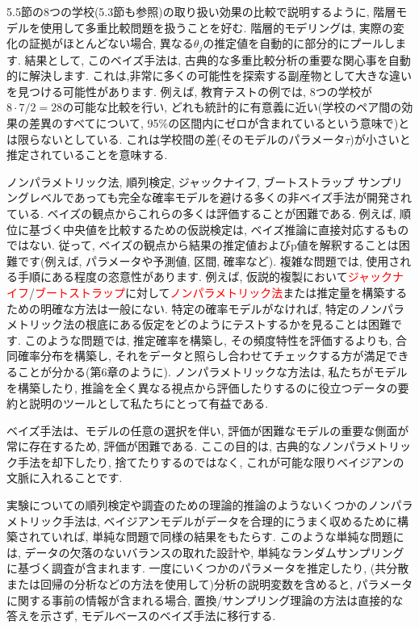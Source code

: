 \documentclass[10pt,dvipdfmx,a4]{beamer}
\newcommand{\tcr}[1]{\textcolor{red}{#1}}
\begin{document}

\begin{frame}
5.5節の8つの学校(5.3節も参照)の取り扱い効果の比較で説明するように, 階層モデルを使用して多重比較問題を扱うことを好む.
階層的モデリングは, 実際の変化の証拠がほとんどない場合, 異なる$\theta_j$の推定値を自動的に部分的にプールします.
結果として, このベイズ手法は, 古典的な多重比較分析の重要な関心事を自動的に解決します.
これは,非常に多くの可能性を探索する副産物として大きな違いを見つける可能性があります.
例えば, 教育テストの例では, 8つの学校が$8\cdot 7/2=28$の可能な比較を行い, どれも統計的に有意義に近い(学校のペア間の効果の差異のすべてについて, 95\%の区間内にゼロが含まれているという意味で)とは限らないとしている.
これは学校間の差(そのモデルのパラメータ$\tau$)が小さいと推定されていることを意味する.

\end{frame}


\begin{frame}{ノンパラメトリック法, 順列検定, ジャックナイフ, ブートストラップ}
サンプリングレベルであっても完全な確率モデルを避ける多くの非ベイズ手法が開発されている.
ベイズの観点からこれらの多くは評価することが困難である.
例えば, 順位に基づく中央値を比較するための仮説検定は, ベイズ推論に直接対応するものではない.
従って, ベイズの観点から結果の推定値およびp値を解釈することは困難です(例えば, パラメータや予測値, 区間, 確率など).
複雑な問題では, 使用される手順にある程度の恣意性があります.
例えば, 仮説的複製において\tcr{ジャックナイフ}/\tcr{ブートストラップ}に対して\tcr{ノンパラメトリック法}または推定量を構築するための明確な方法は一般にない.
特定の確率モデルがなければ, 特定のノンパラメトリック法の根底にある仮定をどのようにテストするかを見ることは困難です.
このような問題では, 推定確率を構築し, その頻度特性を評価するよりも, 合同確率分布を構築し, それをデータと照らし合わせてチェックする方が満足できることが分かる(第6章のように).
ノンパラメトリックな方法は, 私たちがモデルを構築したり, 推論を全く異なる視点から評価したりするのに役立つデータの要約と説明のツールとして私たちにとって有益である.
\end{frame}


\begin{frame}
ベイズ手法は、モデルの任意の選択を伴い, 評価が困難なモデルの重要な側面が常に存在するため, 評価が困難である.
ここの目的は, 古典的なノンパラメトリック手法を却下したり, 捨てたりするのではなく, これが可能な限りベイジアンの文脈に入れることです.

実験についての順列検定や調査のための理論的推論のようないくつかのノンパラメトリック手法は, ベイジアンモデルがデータを合理的にうまく収めるために構築されていれば, 単純な問題で同様の結果をもたらす.
このような単純な問題には, データの欠落のないバランスの取れた設計や, 単純なランダムサンプリングに基づく調査が含まれます.
一度にいくつかのパラメータを推定したり, (共分散または回帰の分析などの方法を使用して)分析の説明変数を含めると, パラメータに関する事前の情報が含まれる場合, 置換/サンプリング理論の方法は直接的な答えを示さず, モデルベースのベイズ手法に移行する.
\end{frame}
\end{document}
